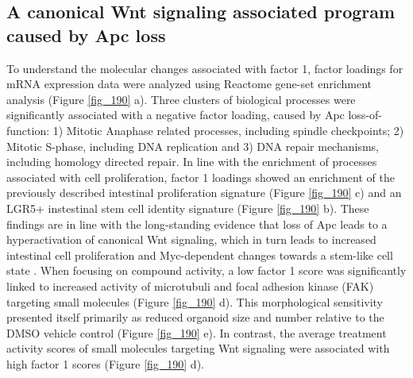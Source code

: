 \begin{flushleft}
\subsection{A canonical Wnt signaling associated program caused by Apc loss}

To understand the molecular changes associated with factor 1, factor loadings for mRNA expression data were analyzed using Reactome gene-set enrichment analysis (Figure \ref{fig_190} a). Three clusters of biological processes were significantly associated with a negative factor loading, caused by Apc loss-of-function: 1) Mitotic Anaphase related processes, including spindle checkpoints; 2) Mitotic S-phase, including DNA replication and 3) DNA repair mechanisms, including homology directed repair. In line with the enrichment of processes associated with cell proliferation, factor 1 loadings showed an enrichment of the previously described intestinal proliferation signature (Figure \ref{fig_190} c) and an LGR5+ instestinal stem cell identity signature (Figure \ref{fig_190} b). These findings are in line with the long-standing evidence that loss of Apc leads to a hyperactivation of canonical Wnt signaling, which in turn leads to increased intestinal cell proliferation and Myc-dependent changes towards a stem-like cell state \citep{Sansom2007-wm, Satoh2017-nd}. When focusing on compound activity, a low factor 1 score was significantly linked to increased activity of microtubuli and focal adhesion kinase (FAK) targeting small molecules (Figure \ref{fig_190} d). This morphological sensitivity presented itself primarily as reduced organoid size and number relative to the DMSO vehicle control (Figure \ref{fig_190} e). In contrast, the average treatment activity scores of small molecules targeting Wnt signaling were associated with high factor 1 scores (Figure \ref{fig_190} d).  



\end{flushleft}
